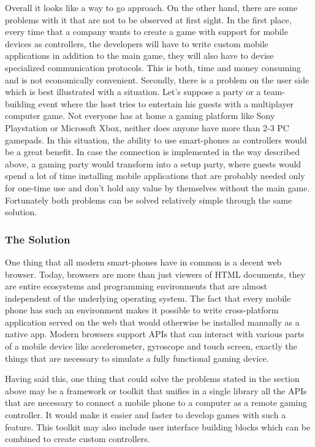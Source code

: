 Overall it looks like a way to go approach. On the other hand, there are some
problems with it that are not to be observed at first sight. In the first
place, every time that a company wants to create a game with support for
mobile devices as controllers, the developers will have to write custom mobile
applications in addition to the main game, they will also have to devise
specialized communication protocols. This is both, time and money consuming
and is not economically convenient. Secondly, there is a problem on the user
side which is best illustrated with a situation. Let's suppose a party or a
team-building event where the host tries to entertain his guests with a
multiplayer computer game. Not everyone has at home a gaming platform like
Sony Playstation or Microsoft Xbox, neither does anyone have more than 2-3 PC
gamepads. In this situation, the ability to use smart-phones as controllers
would be a great benefit. In case the connection is implemented in the way
described above, a gaming party would transform into a setup party, where
guests would spend a lot of time installing mobile applications that are
probably needed only for one-time use and don't hold any value by themselves
without the main game. Fortunately both problems can be solved relatively
simple through the same solution.

\subsubsection{The Solution}

One thing that all modern smart-phones have in common is a decent web browser.
Today, browsers are more than just viewers of HTML documents, they are entire
ecosystems and programming environments that are almost independent of the
underlying operating system. The fact that every mobile phone has such an
environment makes it possible to write cross-platform application served on
the web that would otherwise be installed manually as a native app. Modern
browsers support APIs that can interact with various parts of a mobile device
like accelerometer, gyroscope and touch screen, exactly the things that are
necessary to simulate a fully functional gaming device.

Having said this, one thing that could solve the problems stated in the
section above may be a framework or toolkit that unifies in a single library
all the APIs that are necessary to connect a mobile phone to a computer as a
remote gaming controller. It would make it easier and faster to develop games
with such a feature. This toolkit may also include user interface building
blocks which can be combined to create custom controllers.

